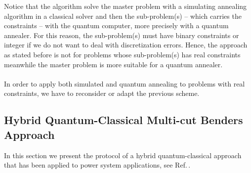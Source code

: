 Notice that the algorithm solve the master problem with a simulating annealing algorithm in a classical solver and then the sub-problem(s) -- which carries the constraints -- with the quantum computer, more precisely with a quantum annealer. For this reason, the sub-problem(s) must have binary constraints or integer if we do not want to deal with discretization errors. Hence, the approach as stated before is not for problems whose sub-problem(s) has real constraints meanwhile the master problem is more suitable for a quantum annealer.\\\\
In order to apply both simulated and quantum annealing to problems with real constraints, we have to reconsider or adapt the previous scheme.
\subsection{Hybrid Quantum-Classical Multi-cut Benders Approach}
In this section we present the protocol of a hybrid quantum-classical approach that has been applied to power system applications, see Ref.\,\cite{Paterakis2021HybridApplication}.\\\\



\newcommand{\keyword}[1]{\textbf{#1}}
\newcommand{\tabhead}[1]{\textbf{#1}}
\newcommand{\code}[1]{\texttt{#1}}
\newcommand{\file}[1]{\texttt{\bfseries#1}}
\newcommand{\option}[1]{\texttt{\itshape#1}}




